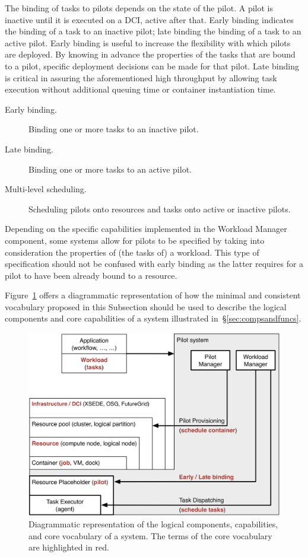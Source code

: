 \documentclass{sig-alternate}
\begin{document}
The binding of tasks to pilots depends on the state of the pilot. A
pilot is inactive until it is executed on a DCI, active after that.
Early binding indicates the binding of a task to an inactive pilot; late
binding the binding of a task to an active pilot. Early binding is
useful to increase the flexibility with which pilots are deployed. By
knowing in advance the properties of the tasks that are bound to a
pilot, specific deployment decisions can be made for that pilot.
Late binding is critical in assuring the aforementioned high throughput by
allowing task execution without additional queuing time or container
instantiation time.

\begin{description}

\item[Early binding.] Binding one or more tasks to an inactive pilot.

\item[Late binding.] Binding one or more tasks to an active pilot.

\item[Multi-level scheduling.] Scheduling pilots onto resources and
tasks onto active or inactive pilots.

\end{description}

Depending on the specific capabilities implemented in the Workload
Manager component, some \pilot systems allow for pilots to be
specified by taking into consideration the properties of (the tasks of) a
workload. This type of specification should not be confused with early
binding as the latter requires for a pilot to have been already
bound to a resource.

Figure~\ref{fig:core_vocabulary} offers a diagrammatic representation of
how the minimal and consistent vocabulary proposed in this Subsection
should be used to describe the logical components and core capabilities
of a \pilot system illustrated in~\S\ref{sec:compsandfuncs}.

\begin{figure}[t]
    \centering
        \includegraphics[width=.48\textwidth]{figures/core_vocabulary.png}
    \caption{Diagrammatic representation of the logical components,
             capabilities, and core vocabulary of a \pilot system.
             The terms of the core vocabulary are highlighted in red.}
    \label{fig:core_vocabulary}
\end{figure}
\end{document}
